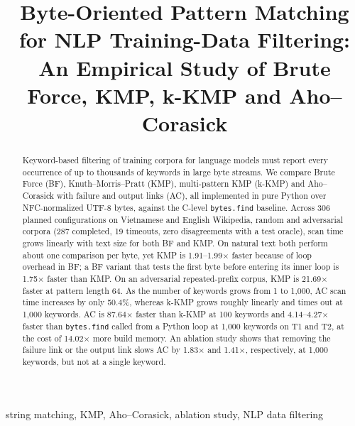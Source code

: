 \documentclass[conference]{IEEEtran}
\begin{document}
\title{Byte-Oriented Pattern Matching for NLP Training-Data Filtering: An Empirical Study of Brute Force, KMP, k-KMP and Aho--Corasick}

\author{
}

\maketitle

\begin{abstract}
Keyword-based filtering of training corpora for language models must report every occurrence of up to thousands of keywords in large byte streams. We compare Brute Force (BF), Knuth--Morris--Pratt (KMP), multi-pattern KMP (k-KMP) and Aho--Corasick with failure and output links (AC), all implemented in pure Python over NFC-normalized UTF-8 bytes, against the C-level \texttt{bytes.find} baseline. Across 306 planned configurations on Vietnamese and English Wikipedia, random and adversarial corpora (287 completed, 19 timeouts, zero disagreements with a test oracle), scan time grows linearly with text size for both BF and KMP. On natural text both perform about one comparison per byte, yet KMP is 1.91--1.99$\times$ faster because of loop overhead in BF; a BF variant that tests the first byte before entering its inner loop is 1.75$\times$ faster than KMP. On an adversarial repeated-prefix corpus, KMP is 21.69$\times$ faster at pattern length 64. As the number of keywords grows from 1 to 1{,}000, AC scan time increases by only 50.4\%, whereas k-KMP grows roughly linearly and times out at 1{,}000 keywords. AC is 87.64$\times$ faster than k-KMP at 100 keywords and 4.14--4.27$\times$ faster than \texttt{bytes.find} called from a Python loop at 1{,}000 keywords on T1 and T2, at the cost of 14.02$\times$ more build memory. An ablation study shows that removing the failure link or the output link slows AC by 1.83$\times$ and 1.41$\times$, respectively, at 1{,}000 keywords, but not at a single keyword.
\end{abstract}

\begin{IEEEkeywords}
string matching, KMP, Aho--Corasick, ablation study, NLP data filtering
\end{IEEEkeywords}
\end{document}
